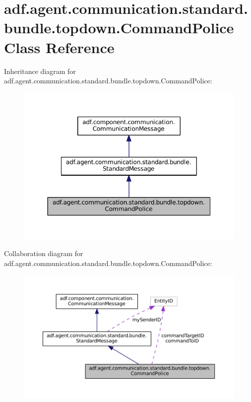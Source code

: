 \hypertarget{classadf_1_1agent_1_1communication_1_1standard_1_1bundle_1_1topdown_1_1CommandPolice}{}\section{adf.\+agent.\+communication.\+standard.\+bundle.\+topdown.\+Command\+Police Class Reference}
\label{classadf_1_1agent_1_1communication_1_1standard_1_1bundle_1_1topdown_1_1CommandPolice}


Inheritance diagram for adf.\+agent.\+communication.\+standard.\+bundle.\+topdown.\+Command\+Police\+:
\nopagebreak
\begin{figure}[H]
\begin{center}
\leavevmode
\includegraphics[width=350pt]{classadf_1_1agent_1_1communication_1_1standard_1_1bundle_1_1topdown_1_1CommandPolice__inherit__graph}
\end{center}
\end{figure}


Collaboration diagram for adf.\+agent.\+communication.\+standard.\+bundle.\+topdown.\+Command\+Police\+:
\nopagebreak
\begin{figure}[H]
\begin{center}
\leavevmode
\includegraphics[width=350pt]{classadf_1_1agent_1_1communication_1_1standard_1_1bundle_1_1topdown_1_1CommandPolice__coll__graph}
\end{center}
\end{figure}
